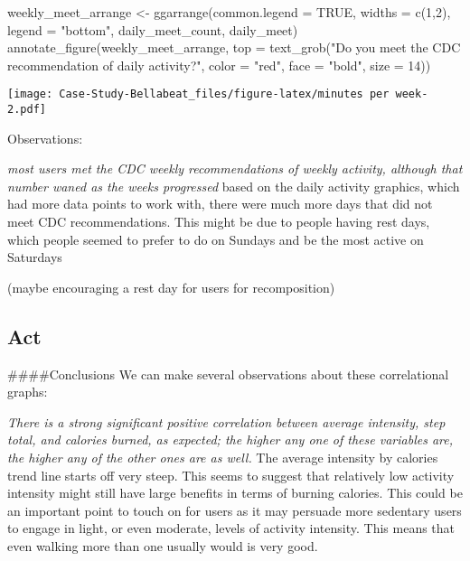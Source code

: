\documentclass[
]{article}
\newenvironment{Shaded}{\begin{snugshade}}{\end{snugshade}}
\newcommand{\AttributeTok}[1]{\textcolor[rgb]{0.77,0.63,0.00}{#1}}
\newcommand{\ConstantTok}[1]{\textcolor[rgb]{0.00,0.00,0.00}{#1}}
\newcommand{\DecValTok}[1]{\textcolor[rgb]{0.00,0.00,0.81}{#1}}
\newcommand{\FunctionTok}[1]{\textcolor[rgb]{0.00,0.00,0.00}{#1}}
\newcommand{\NormalTok}[1]{#1}
\newcommand{\OtherTok}[1]{\textcolor[rgb]{0.56,0.35,0.01}{#1}}
\newcommand{\StringTok}[1]{\textcolor[rgb]{0.31,0.60,0.02}{#1}}
\begin{document}
\begin{Shaded}
\begin{Highlighting}[]
\NormalTok{weekly\_meet\_arrange }\OtherTok{\textless{}{-}} \FunctionTok{ggarrange}\NormalTok{(}\AttributeTok{common.legend =} \ConstantTok{TRUE}\NormalTok{, }\AttributeTok{widths =} \FunctionTok{c}\NormalTok{(}\DecValTok{1}\NormalTok{,}\DecValTok{2}\NormalTok{), }\AttributeTok{legend =} \StringTok{"bottom"}\NormalTok{, daily\_meet\_count, daily\_meet)}
\FunctionTok{annotate\_figure}\NormalTok{(weekly\_meet\_arrange, }\AttributeTok{top =} \FunctionTok{text\_grob}\NormalTok{(}\StringTok{"Do you meet the CDC recommendation of daily activity?"}\NormalTok{, }
               \AttributeTok{color =} \StringTok{"red"}\NormalTok{, }\AttributeTok{face =} \StringTok{"bold"}\NormalTok{, }\AttributeTok{size =} \DecValTok{14}\NormalTok{))}
\end{Highlighting}
\end{Shaded}

\texttt{[image: Case-Study-Bellabeat\_files/figure-latex/minutes per week-2.pdf]}

Observations:

\emph{most users met the CDC weekly recommendations of weekly activity,
although that number waned as the weeks progressed }based on the daily
activity graphics, which had more data points to work with, there were
much more days that did not meet CDC recommendations. This might be due
to people having rest days, which people seemed to prefer to do on
Sundays and be the most active on Saturdays

(maybe encouraging a rest day for users for recomposition)

\hypertarget{act}{%
\subsection{Act}\label{act}}

\#\#\#\#Conclusions We can make several observations about these
correlational graphs:

\emph{There is a strong significant positive correlation between average
intensity, step total, and calories burned, as expected; the higher any
one of these variables are, the higher any of the other ones are as
well. }The average intensity by calories trend line starts off very
steep. This seems to suggest that relatively low activity intensity
might still have large benefits in terms of burning calories. This could
be an important point to touch on for users as it may persuade more
sedentary users to engage in light, or even moderate, levels of activity
intensity. This means that even walking more than one usually would is
very good.
\end{document}
